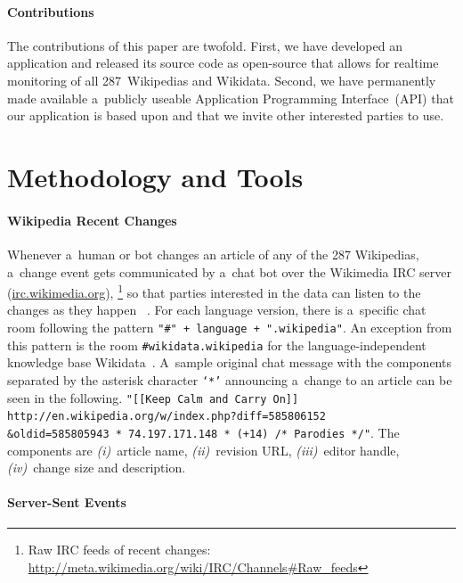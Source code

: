 \documentclass{sig-alternate}
\newcommand{\inlinelistingsize}{\fontsize{8pt}{11pt}}
\let\oldurl\url
\renewcommand{\url}[1]{\inlinelistingsize\oldurl{#1}}
\begin{document}
\paragraph{Contributions}

The contributions of this paper are twofold.
First, we have developed an application
and released its source code as open-source
that allows for realtime monitoring of all 287~Wikipedias and Wikidata.
Second, we have permanently made available a~publicly useable
Application Programming Interface~(API) that our application
is based upon and that we invite other interested parties to use.

\section{Methodology and Tools}

\paragraph{Wikipedia Recent Changes}
\label{sec:wikipedia-recent-changes}

Whenever a~human or bot changes an article
of any of the 287 Wikipedias,
a~change event gets communicated by a~chat bot
over the Wikimedia IRC server (\url{irc.wikimedia.org}),%
\footnote{Raw IRC feeds of recent changes:
\url{http://meta.wikimedia.org/wiki/IRC/Channels\#Raw_feeds}}
so that parties interested in the data
can listen to the changes as they happen%
~\cite{steiner2013mjnomore}.
For each language version, there is
a~specific chat room following the pattern
\texttt{"\#" + language + ".wikipedia"}.
An exception from this pattern is the room
\texttt{\#wikidata.wikipedia} for the language-independent
knowledge base Wikidata~\cite{vrandecic2012wikidata}.
A~sample original chat message with the components separated
by the asterisk character \texttt{`*'}
announcing a~change to an article
can be seen in the following.
\texttt{"[[Keep Calm and Carry On]] http://en.wikipedia.org/w/index.php?diff=585806152\\\&oldid=585805943 * 74.197.171.148 * (+14) /* Paro\-dies */"}.
The components are \emph{(i)}~article name, \emph{(ii)}~revision URL,
\emph{(iii)}~editor handle,
\emph{(iv)}~change size and description.

\paragraph{Server-Sent Events}
\end{document}
